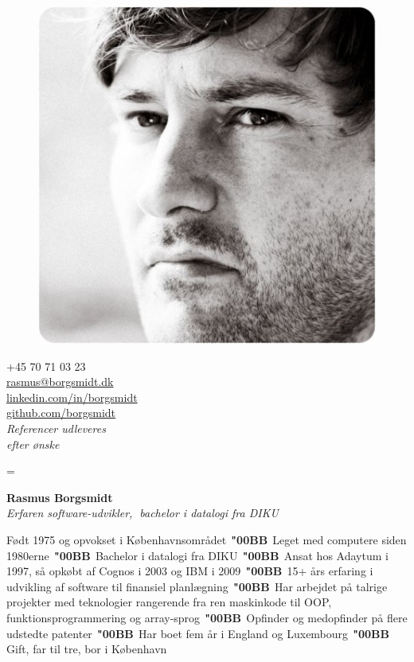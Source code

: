 \documentclass[a4paper,10pt,final]{memoir}
\newcommand{\Sep}{\vspace{1.5em}}
\newcommand{\Dot}{\mbox{\color{SpotColor}$\,\;$\textbf{\char"00BB}$\,\;$}}
\newenvironment{inlinepar}[1]
	{\ignorespaces{\lowsmallcapsspacing{\textbf{#1}}}}
	{\ignorespacesafterend}
\begin{document}
\begin{figure}
	\hfill
	\includegraphics[width=0.6\columnwidth]{../media/borgsmidt.jpg}
	\vspace{-7cm}
\end{figure}

\begin{flushright}\footnotesize
  +45 70 71 03 23\\
  \href{mailto:rasmus@borgsmidt.dk}{rasmus@borgsmidt.dk}\\
  \href{http://dk.linkedin.com/in/borgsmidt}{linkedin.com/in/borgsmidt}\\
  \href{https://github.com/borgsmidt}{github.com/borgsmidt}\\[12pt]
  {\em Referencer udleveres\\ efter ønske}
\end{flushright}\normalsize
\framebreak

\font%
\font%
\font=\font%

\huge{\textbf{Rasmus Borgsmidt}} \\
\Large{\color{SpotColor}\em Erfaren software-udvikler,$\;$ bachelor i datalogi fra DIKU}

\normalsize\normalfont

\Sep\begin{inlinepar}{kort om mig}
  Født 1975 og opvokset i Københavnsområdet\Dot Leget med computere siden
  1980\-erne\Dot Bachelor i datalogi fra DIKU\Dot Ansat hos Adaytum i 1997, så
  opkøbt af \mbox{Cognos} i 2003 og IBM i 2009\Dot 15+ års erfaring i udvikling
  af software til finansiel planlægning\Dot Har arbejdet på talrige projekter
  med tekno\-logier rangerende fra ren maskinkode til OOP,
  funktionsprogrammering og array-sprog\Dot Opfinder og medopfinder på flere
  udstedte patenter\Dot Har boet fem år i England og Luxembourg\Dot Gift, far
  til tre, bor i København
\end{inlinepar}
\end{document}
